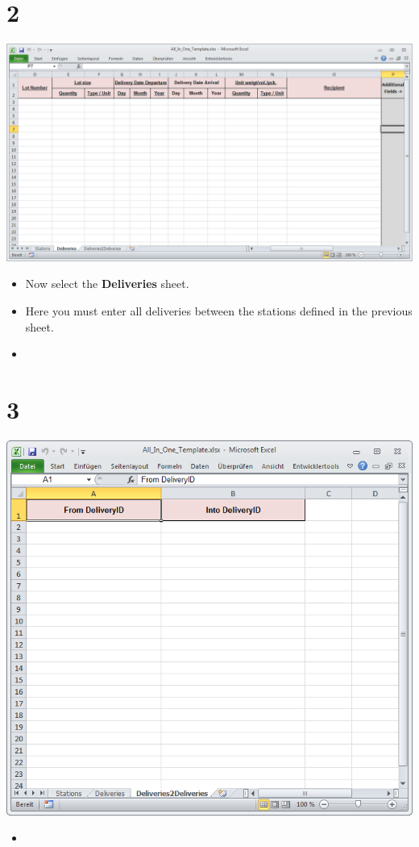 \documentclass{beamer}
\begin{document}
\section{2}
\begin{frame}
	\begin{center}
  		\includegraphics[height=0.6\textheight]{2.png}
	\end{center}
	\begin{itemize}
		\item Now select the \textbf{Deliveries} sheet.
		\item Here you must enter all deliveries between the stations defined in the previous sheet.
		\item
	\end{itemize}
\end{frame}

\section{3}
\begin{frame}
	\begin{center}
  		\includegraphics[height=0.6\textheight]{3.png}
	\end{center}
	\begin{itemize}
		\item
	\end{itemize}
\end{frame}
\end{document}

